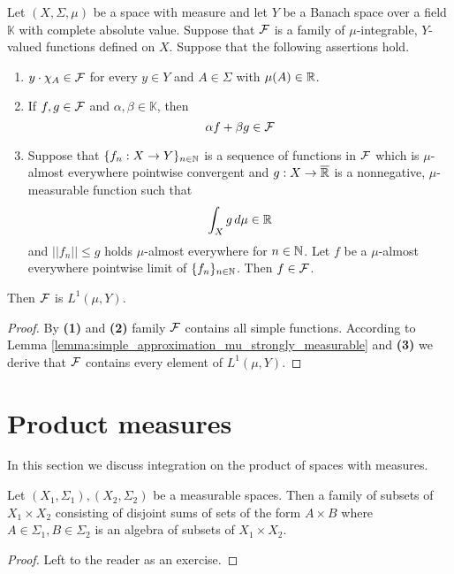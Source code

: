 \begin{corollary}\label{corollary:measurable_induction_for_banach_valued}
Let $(X,\Sigma,\mu)$ be a space with measure and let $Y$ be a Banach space over a field $\mathbb{K}$ with complete absolute value. Suppose that ${\mathcal F}$ is a family of $\mu$-integrable, $Y$-valued functions defined on $X$. Suppose that the following assertions hold.
\begin{enumerate}[label=\emph{\textbf{(\arabic*)}}, leftmargin=*]
\item $y\cdot \chi_A\in {\mathcal F}$ for every $y\in Y$ and $A\in \Sigma$ with $\mu(A)\in {\mathbb R}$.
\item If $f, g\in {\mathcal F}$ and $\alpha, \beta\in \mathbb{K}$, then
$$\alpha f + \beta g\in {\mathcal F}$$
\item Suppose that $\{f_n:X\rightarrow Y\}_{n\in {\mathbb N}}$ is a sequence of functions in ${\mathcal F}$ which is $\mu$-almost everywhere pointwise convergent and $g:X\rightarrow \overline{{\mathbb R}}$ is a nonnegative, $\mu$-measurable function such that
$$\int_Xg\,d\mu \in {\mathbb R}$$
and $||f_n||\leq g$ holds $\mu$-almost everywhere for $n\in {\mathbb N}$. Let $f$ be a $\mu$-almost everywhere pointwise limit of $\{f_n\}_{n\in {\mathbb N}}$. Then $f\in {\mathcal F}$.
\end{enumerate}
Then ${\mathcal F}$ is $L^1(\mu,Y)$.
\end{corollary}
\begin{proof}
By \textbf{(1)} and \textbf{(2)} family ${\mathcal F}$ contains all simple functions. According to Lemma \ref{lemma:simple_approximation_mu_strongly_measurable} and \textbf{(3)} we derive that ${\mathcal F}$ contains every element of $L^1(\mu,Y)$.
\end{proof}

\section{Product measures}
\noindent
In this section we discuss integration on the product of spaces with measures.

\begin{fact}\label{fact:productalgebra}
Let $(X_1,\Sigma_1), (X_2,\Sigma_2)$ be a measurable spaces. Then a family of subsets of $X_1\times X_2$ consisting of disjoint sums of sets of the form $A\times B$ where $A\in \Sigma_1, B\in \Sigma_2$ is an algebra of subsets of $X_1\times X_2$.
\end{fact}
\begin{proof}
Left to the reader as an exercise.
\end{proof}

